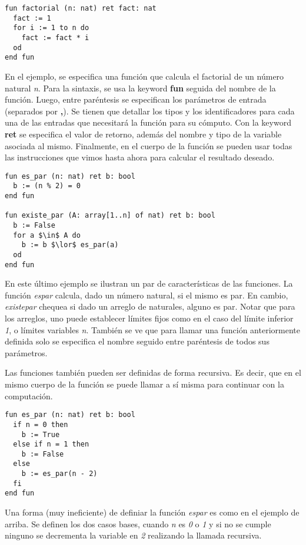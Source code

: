 \documentclass{article}
\newcommand{\gbajo}{\textunderscore}
\begin{document}
\begin{lstlisting}
fun factorial (n: nat) ret fact: nat
  fact := 1
  for i := 1 to n do
    fact := fact * i
  od
end fun
\end{lstlisting}

En el ejemplo, se especifica una función que calcula el factorial de un número natural \textit{n}.
Para la sintaxis, se usa la keyword \textbf{fun} seguida del nombre de la función.
Luego, entre paréntesis se especifican los parámetros de entrada (separados por \textbf{,}).
Se tienen que detallar los tipos y los identificadores para cada una de las entradas que necesitará la función para su cómputo.
Con la keyword \textbf{ret} se especifica el valor de retorno, además del nombre y tipo de la variable asociada al mismo.
Finalmente, en el cuerpo de la función se pueden usar todas las instrucciones que vimos hasta ahora para calcular el resultado deseado.

\begin{lstlisting}
fun es_par (n: nat) ret b: bool
  b := (n % 2) = 0
end fun

fun existe_par (A: array[1..n] of nat) ret b: bool
  b := False
  for a $\in$ A do
    b := b $\lor$ es_par(a)
  od
end fun
\end{lstlisting}

En este último ejemplo se ilustran un par de características de las funciones.
La función \textit{es\gbajo par} calcula, dado un número natural, si el mismo es par.
En cambio, \textit{existe\gbajo par} chequea si dado un arreglo de naturales, alguno es par.
Notar que para los arreglos, uno puede establecer límites fijos como en el caso del límite inferior \textit{1}, o límites variables \textit{n}.
También se ve que para llamar una función anteriormente definida solo se especifica el nombre seguido entre paréntesis de todos sus parámetros.

Las funciones también pueden ser definidas de forma recursiva.
Es decir, que en el mismo cuerpo de la función se puede llamar a sí misma para continuar con la computación.

\begin{lstlisting}
fun es_par (n: nat) ret b: bool
  if n = 0 then
    b := True
  else if n = 1 then
    b := False
  else
    b := es_par(n - 2)
  fi
end fun
\end{lstlisting}

Una forma (muy ineficiente) de definiar la función \textit{es\gbajo par} es como en el ejemplo de arriba.
Se definen los dos casos bases, cuando \textit{n} es \textit{0} o \textit{1} y si no se cumple ninguno se decrementa la variable en \textit{2} realizando la llamada recursiva.
\end{document}
